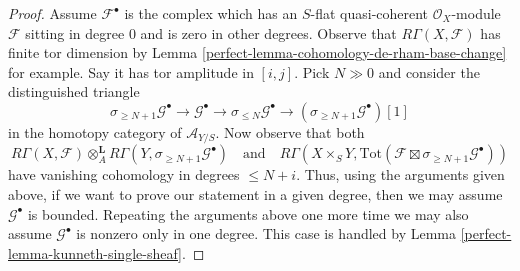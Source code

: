 \begin{proof}
\medskip\noindent
Assume $\mathcal{F}^\bullet$ is the complex which has an $S$-flat quasi-coherent
$\mathcal{O}_X$-module $\mathcal{F}$ sitting in degree $0$ and is zero in
other degrees. Observe that $R\Gamma(X, \mathcal{F})$ has finite
tor dimension by Lemma \ref{perfect-lemma-cohomology-de-rham-base-change} for example.
Say it has tor amplitude in $[i, j]$.
Pick $N \gg 0$ and consider the distinguished triangle
$$
\sigma_{\geq N + 1}\mathcal{G}^\bullet \to
\mathcal{G}^\bullet \to
\sigma_{\leq N}\mathcal{G}^\bullet \to
(\sigma_{\geq N + 1}\mathcal{G}^\bullet)[1]
$$
in the homotopy category of $\mathcal{A}_{Y/S}$. Now observe that both
$$
R\Gamma(X, \mathcal{F})
\otimes_A^\mathbf{L}
R\Gamma(Y, \sigma_{\geq N + 1}\mathcal{G}^\bullet)
\quad\text{and}\quad
R\Gamma(X \times_S Y,
\text{Tot}(\mathcal{F} \boxtimes \sigma_{\geq N + 1}\mathcal{G}^\bullet))
$$
have vanishing cohomology in degrees $\leq N + i$. Thus, using the arguments
given above, if we want to prove our statement in a given degree, then we may
assume $\mathcal{G}^\bullet$ is bounded.
Repeating the arguments above one more time we may also assume
$\mathcal{G}^\bullet$ is nonzero only in one degree.
This case is handled by Lemma \ref{perfect-lemma-kunneth-single-sheaf}.
\end{proof}


